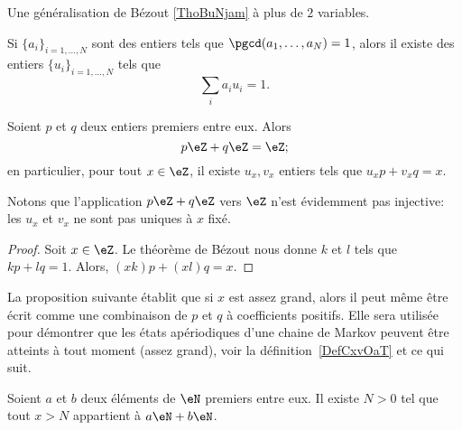 Une généralisation de Bézout \ref{ThoBuNjam} à plus de \( 2\) variables.
\begin{proposition}     \label{PROPooWSMTooMdfqse}
    Si \( \{ a_i \}_{i=1,\ldots, N}\) sont des entiers tels que \( \pgcd(a_1,\ldots, a_N)=1\), alors il existe des entiers \( \{ u_i \}_{i=1,\ldots, N}\) tels que
    \begin{equation}
        \sum_ia_iu_i=1.
    \end{equation}
\end{proposition}

\begin{corollary}       \label{CorgEMtLj}
    Soient \( p\) et \( q\) deux entiers premiers entre eux. Alors
    \begin{equation}
        p\eZ+q\eZ=\eZ;
    \end{equation}
    en particulier, pour tout \( x \in \eZ \), il existe \( u_x, v_x \) entiers tels que \(u_x p + v_x q = x \).
\end{corollary}

Notons que l'application \( p\eZ+q\eZ\) vers \( \eZ\) n'est évidemment pas injective: les $u_x$ et $v_x$ ne sont pas uniques à $x$ fixé.

\begin{proof}
    Soit \( x\in \eZ\). Le théorème de Bézout nous donne \( k\) et \( l\) tels que \( kp+lq=1\). Alors, \( (xk)p+(xl)q=x\).
\end{proof}

La proposition suivante établit que si \( x\) est assez grand, alors il peut même être écrit comme une combinaison de \( p\) et \( q\) à coefficients positifs. Elle sera utilisée pour démontrer que les états apériodiques d'une chaine de Markov peuvent être atteints à tout moment (assez grand), voir la définition~\ref{DefCxvOaT} et ce qui suit.

\begin{proposition}     \label{PropLAbRSE}
    Soient \( a\) et \( b\) deux éléments de \( \eN\) premiers entre eux. Il existe \( N>0\) tel que tout \( x>N\) appartient à \( a\eN+b\eN\).
\end{proposition}

